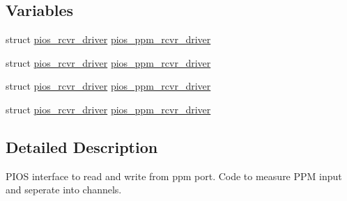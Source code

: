 \subsection*{\-Variables}
\begin{DoxyCompactItemize}
\item 
struct \hyperlink{structpios__rcvr__driver}{pios\-\_\-rcvr\-\_\-driver} \hyperlink{group___p_i_o_s___p_p_m_ga45134211ce1772871927ca3a1fbc2e20}{pios\-\_\-ppm\-\_\-rcvr\-\_\-driver}
\item 
struct \hyperlink{structpios__rcvr__driver}{pios\-\_\-rcvr\-\_\-driver} \hyperlink{group___p_i_o_s___p_p_m_ga45134211ce1772871927ca3a1fbc2e20}{pios\-\_\-ppm\-\_\-rcvr\-\_\-driver}
\item 
struct \hyperlink{structpios__rcvr__driver}{pios\-\_\-rcvr\-\_\-driver} \hyperlink{group___p_i_o_s___p_p_m_ga45134211ce1772871927ca3a1fbc2e20}{pios\-\_\-ppm\-\_\-rcvr\-\_\-driver}
\item 
struct \hyperlink{structpios__rcvr__driver}{pios\-\_\-rcvr\-\_\-driver} \hyperlink{group___p_i_o_s___p_p_m_ga45134211ce1772871927ca3a1fbc2e20}{pios\-\_\-ppm\-\_\-rcvr\-\_\-driver}
\end{DoxyCompactItemize}


\subsection{\-Detailed \-Description}
\-P\-I\-O\-S interface to read and write from ppm port. \-Code to measure \-P\-P\-M input and seperate into channels. 

